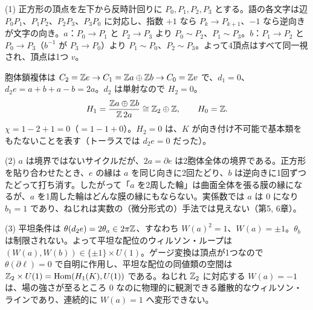 \begin{solution}
(1) 正方形の頂点を左下から反時計回りに $P_0,P_1,P_2,P_3$ とする。語の各文字は辺 $P_0P_1$、$P_1P_2$、$P_2P_3$、$P_3P_0$ に対応し、指数 $+1$ なら $P_k\to P_{k+1}$、$-1$ なら逆向きが文字の向き。$a$：$P_0\to P_1$ と $P_2\to P_3$ より $P_0\sim P_2$、$P_1\sim P_3$。$b$：$P_1\to P_2$ と $P_0\to P_3$（$b^{-1}$ が $P_3\to P_0$）より $P_1\sim P_0$、$P_2\sim P_3$。よって4頂点はすべて同一視され、頂点は1つ $v$。

胞体鎖複体は $C_2=\mathbb{Z} e\to C_1=\mathbb{Z} a\oplus\mathbb{Z} b\to C_0=\mathbb{Z} v$ で、$d_1=0$、$d_2e=a+b+a-b=2a$。$d_2$ は単射なので $H_2=0$。
\[
H_1=\frac{\mathbb{Z} a\oplus\mathbb{Z} b}{\mathbb{Z}\,2a}\cong\mathbb{Z}_2\oplus\mathbb{Z},\qquad H_0=\mathbb{Z} .
\]
$\chi=1-2+1=0$（$=1-1+0$）。$H_2=0$ は、$K$ が向き付け不可能で基本類をもたないことを表す（トーラスでは $d_2e=0$ だった）。

(2) $a$ は境界ではないサイクルだが、$2a=\partial e$ は2胞体全体の境界である。正方形を貼り合わせたとき、$e$ の縁は $a$ を同じ向きに2回たどり、$b$ は逆向きに1回ずつたどって打ち消す。したがって「$a$ を2周した輪」は曲面全体を張る膜の縁になるが、$a$ を1周した輪はどんな膜の縁にもならない。実係数では $a$ は $0$ になり $b_1=1$ であり、ねじれは実数の（微分形式の）手法では見えない（第5, 6章）。

(3) 平坦条件は $\theta(d_2e)=2\theta_a\in2\pi\mathbb{Z}$、すなわち $W(a)^2=1$、$W(a)=\pm1$。$\theta_b$ は制限されない。よって平坦な配位のウィルソン・ループは $(W(a),W(b))\in\{\pm1\}\times U(1)$。ゲージ変換は頂点が1つなので $\theta(\partial\ell)=0$ で自明に作用し、平坦な配位の同値類の空間は $\mathbb{Z}_2\times U(1)=\operatorname{Hom}(H_1(K),U(1))$ である。ねじれ $\mathbb{Z}_2$ に対応する $W(a)=-1$ は、場の強さが至るところ $0$ なのに物理的に観測できる離散的なウィルソン・ラインであり、連続的に $W(a)=1$ へ変形できない。
\end{solution}

